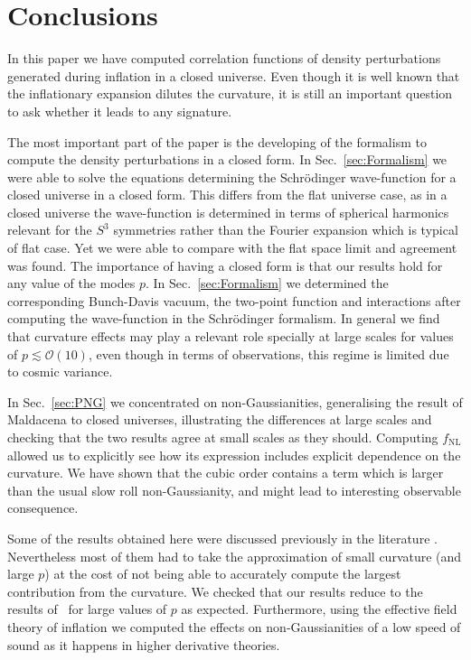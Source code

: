 \documentclass[a4paper,11pt]{article}
\numberwithin{equation}{section}
\numberwithin{equation}{section}
\begin{document}

\section{Conclusions}
\label{sec:Conclusions}



In this paper we have computed correlation functions of density perturbations generated during inflation in a closed universe. Even though it is well known that the inflationary expansion dilutes the curvature, it is still an important question to ask whether it leads to any signature.

The most important part of the paper is the developing of the formalism to compute the density perturbations in a closed form. In Sec.~\ref{sec:Formalism} we were able to solve the equations determining the Schr\"odinger wave-function for a closed universe in a closed form. This differs from the flat universe case, as in a closed universe the wave-function is determined in terms of spherical harmonics relevant for the $S^3$ symmetries rather than the Fourier expansion which is typical of flat case. Yet we were able to compare with the flat space limit and agreement was found. The importance of having a closed form is that our results hold for any value of the modes $p$. In Sec.~\ref{sec:Formalism} we determined the corresponding Bunch-Davis vacuum, the two-point function and interactions after computing the wave-function in the Schr\"odinger formalism. In general we find that curvature effects may play a relevant role specially at large scales for values of $p\lesssim \mathcal{O}(10)$, even though in terms of observations, this regime is limited due to cosmic variance.

In Sec.~\ref{sec:PNG} we concentrated on non-Gaussianities, generalising the result of Maldacena to closed universes, illustrating the differences at large scales and checking that the two results agree at small scales as they should. Computing $f_{\mathrm{NL}}$ allowed us to explicitly see how its expression includes explicit dependence on the curvature.
We have shown that the cubic order contains a term which is larger than the usual slow roll non-Gaussianity, and might lead to interesting observable consequence. 

Some of the results obtained here were discussed previously in the literature \cite{Seery:2010kh}. Nevertheless most of them had to take the approximation of small curvature (and large $p$) at the cost of not being able to accurately compute the largest contribution from the curvature. We checked that our results reduce to the results of~\cite{Maldacena:2002vr,Seery:2010kh} for large values of $p$ as expected. Furthermore, using the effective field theory of inflation we computed the effects on non-Gaussianities of a low speed of sound as it happens in higher derivative theories.
\end{document}
